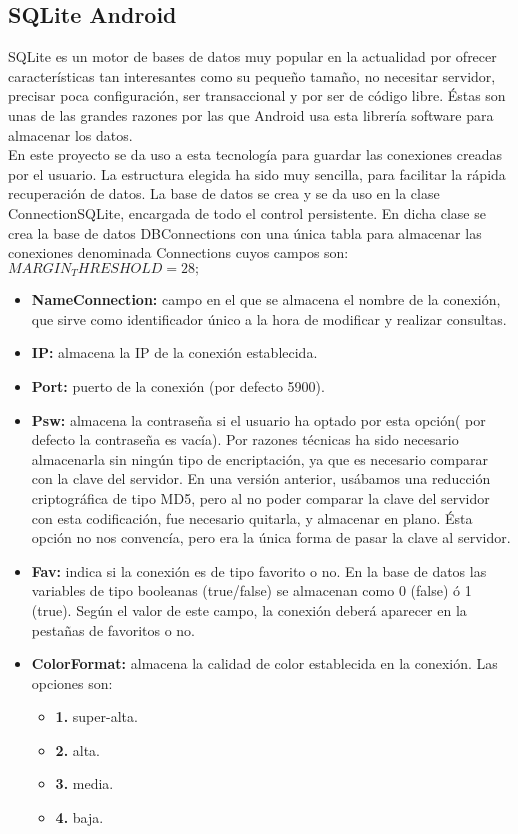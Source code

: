 \subsection{SQLite Android}

SQLite es un motor de bases de datos muy popular en la actualidad por ofrecer características tan interesantes como su pequeño tamaño, no necesitar servidor, precisar poca configuración, ser transaccional y por ser de código libre. Éstas son unas de las grandes razones por las que Android usa esta librería software para almacenar los datos. \\

En este proyecto se da uso a esta tecnología para guardar las conexiones creadas por el usuario. La estructura elegida ha sido muy sencilla, para facilitar la rápida recuperación de datos. La base de datos se crea y se da uso en la clase ConnectionSQLite, encargada de todo el control persistente. En dicha clase se crea la base de datos DBConnections con una única tabla para almacenar las conexiones denominada Connections cuyos campos son: $MARGIN_THRESHOLD = 28;$\\

\begin{itemize}

\item \textbf{NameConnection:} campo en el que se almacena el nombre de la conexión, que sirve como identificador único a la hora de modificar y realizar consultas.
\item \textbf{IP:} almacena la IP de la conexión establecida.
\item \textbf{Port:} puerto de la conexión (por defecto 5900).
\item \textbf{Psw:} almacena la contraseña si el usuario ha optado por esta opción( por defecto la contraseña es vacía). Por razones técnicas ha sido necesario almacenarla sin ningún tipo de encriptación, ya que es necesario comparar con la clave del servidor. En una versión anterior, usábamos una reducción criptográfica de tipo MD5, pero al no poder comparar la clave del servidor con esta codificación, fue necesario quitarla, y almacenar en plano. Ésta opción no nos convencía, pero era la única forma de pasar la clave al servidor.
\item \textbf{Fav:} indica si la conexión es de tipo favorito o no. En la base de datos las variables de tipo booleanas (true/false) se almacenan como 0 (false) ó 1 (true). Según el valor de este campo, la conexión deberá aparecer en la pestañas de favoritos o no.
\item \textbf{ColorFormat:} almacena la calidad de color establecida en la conexión. Las opciones son:

\begin{itemize}
\item \textbf{1.} super-alta.
\item \textbf{2.} alta.
\item \textbf{3.} media.
\item \textbf{4.} baja.

\end{itemize}

\end{itemize}

